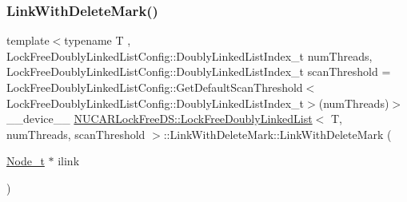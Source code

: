\subsubsection{\texorpdfstring{Link\+With\+Delete\+Mark()}{LinkWithDeleteMark()}\hspace{0.1cm}{\footnotesize\ttfamily [2/5]}}
{\footnotesize\ttfamily template$<$typename T , Lock\+Free\+Doubly\+Linked\+List\+Config\+::\+Doubly\+Linked\+List\+Index\+\_\+t num\+Threads, Lock\+Free\+Doubly\+Linked\+List\+Config\+::\+Doubly\+Linked\+List\+Index\+\_\+t scan\+Threshold = Lock\+Free\+Doubly\+Linked\+List\+Config\+::\+Get\+Default\+Scan\+Threshold$<$\+Lock\+Free\+Doubly\+Linked\+List\+Config\+::\+Doubly\+Linked\+List\+Index\+\_\+t$>$(num\+Threads)$>$ \\
\+\_\+\+\_\+device\+\_\+\+\_\+ \mbox{\hyperlink{class_n_u_c_a_r_lock_free_d_s_1_1_lock_free_doubly_linked_list}{N\+U\+C\+A\+R\+Lock\+Free\+D\+S\+::\+Lock\+Free\+Doubly\+Linked\+List}}$<$ T, num\+Threads, scan\+Threshold $>$\+::Link\+With\+Delete\+Mark\+::\+Link\+With\+Delete\+Mark (\begin{DoxyParamCaption}\item[{\mbox{\hyperlink{class_n_u_c_a_r_lock_free_d_s_1_1_lock_free_doubly_linked_list_abb8fd1da564d74028552e980bc99a704}{Node\+\_\+t}} $\ast$}]{ilink }\end{DoxyParamCaption})\hspace{0.3cm}{\ttfamily [inline]}}

\mbox{\label{class_n_u_c_a_r_lock_free_d_s_1_1_lock_free_doubly_linked_list_1_1_link_with_delete_mark_ac3ab968f96ba442b40d9bc8bd48a7604}} 
